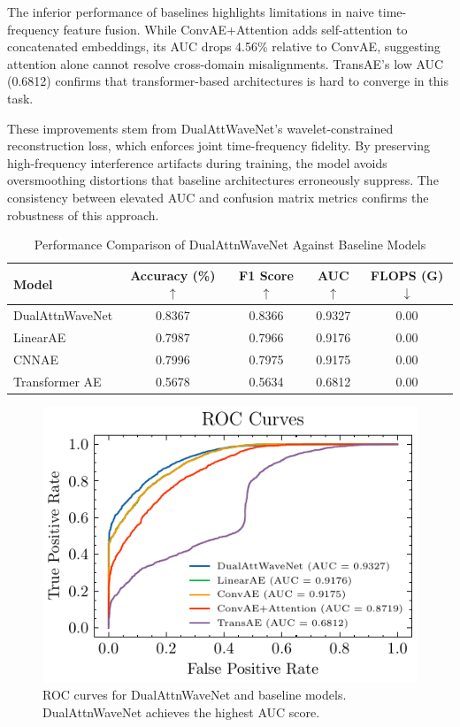 \documentclass[12pt]{article}
\begin{document}
The inferior performance of baselines highlights limitations in naive time-frequency feature fusion. While ConvAE+Attention adds self-attention to concatenated embeddings, its AUC drops 4.56\% relative to ConvAE, suggesting attention alone cannot resolve cross-domain misalignments. TransAE’s low AUC (0.6812) confirms that transformer-based architectures is hard to converge in this task.



These improvements stem from DualAttWaveNet’s wavelet-constrained reconstruction loss, which enforces joint time-frequency fidelity. By preserving high-frequency interference artifacts during training, the model avoids oversmoothing distortions that baseline architectures erroneously suppress. The consistency between elevated AUC and confusion matrix metrics confirms the robustness of this approach.

\begin{table}[t]
    \caption{Performance Comparison of DualAttnWaveNet Against Baseline Models}
    \label{tab:main_results}
    \centering
    \begin{tabular}{lcccc}
        \toprule
        \textbf{Model}  & \textbf{Accuracy (\%) } $\uparrow$ & \textbf{F1 Score} $\uparrow$ & \textbf{AUC}$\uparrow$ & \textbf{FLOPS (G)}$\downarrow$ \\
        \midrule
        DualAttnWaveNet & 0.8367                             & 0.8366                       & 0.9327                 & 0.00                           \\
        \cmidrule{1-5}
        LinearAE        & 0.7987                             & 0.7966                       & 0.9176                 & 0.00                           \\
        CNNAE           & 0.7996                             & 0.7975                       & 0.9175                 & 0.00                           \\
        Transformer AE  & 0.5678                             & 0.5634                       & 0.6812                 & 0.00                           \\
        \bottomrule
    \end{tabular}
\end{table}

\begin{figure}[htbp]
    \centering
    \includegraphics[width=0.5\linewidth]{roc-comparison.pdf}
    \caption{ROC curves for DualAttnWaveNet and baseline models. DualAttnWaveNet achieves the highest AUC score.}
    \label{fig:roc_comparison}
\end{figure}
\end{document}

